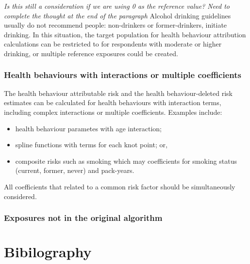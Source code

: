 \documentclass[]{book}
\providecommand{\tightlist}{%
  \setlength{\itemsep}{0pt}\setlength{\parskip}{0pt}}
\begin{document}
\emph{Is this still a consideration if we are using 0 as the reference
value?} \emph{Need to complete the thought at the end of the paragraph}
Alcohol drinking guidelines usually do not recommend people:
non-drinkers or former-drinkers, initiate drinking. In this situation,
the target population for health behaviour attribution calculations can
be restricted to for respondents with moderate or higher drinking, or
multiple reference exposures could be created.

\subsection{Health behaviours with interactions or multiple
coefficients}\label{health-behaviours-with-interactions-or-multiple-coefficients}

The health behaviour attributable risk and the health behaviour-deleted
risk estimates can be calculated for health behaviours with interaction
terms, including complex interactions or multiple coefficients. Examples
include:

\begin{itemize}
\tightlist
\item
  health behaviour parametes with age interaction;
\item
  spline functions with terms for each knot point; or,
\item
  composite risks such as smoking which may coefficients for smoking
  status (current, former, never) and pack-years.
\end{itemize}

All coefficients that related to a common risk factor should be
simultaneously considered.

\subsection{Exposures not in the original
algorithm}\label{exposures-not-in-the-original-algorithm}

\chapter{Bibilography}\label{bibilography}


\end{document}
